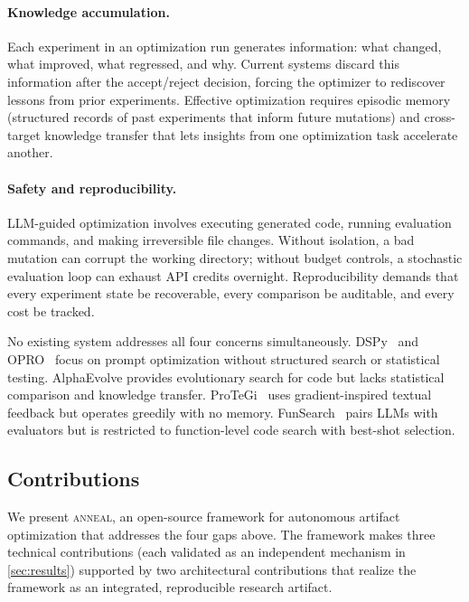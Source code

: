 \paragraph{Knowledge accumulation.}
Each experiment in an optimization run generates information: what changed, what improved, what regressed, and why.
Current systems discard this information after the accept/reject decision, forcing the optimizer to rediscover lessons from prior experiments.
Effective optimization requires episodic memory (structured records of past experiments that inform future mutations) and cross-target knowledge transfer that lets insights from one optimization task accelerate another.

\paragraph{Safety and reproducibility.}
LLM-guided optimization involves executing generated code, running evaluation commands, and making irreversible file changes.
Without isolation, a bad mutation can corrupt the working directory; without budget controls, a stochastic evaluation loop can exhaust API credits overnight.
Reproducibility demands that every experiment state be recoverable, every comparison be auditable, and every cost be tracked.

\medskip

No existing system addresses all four concerns simultaneously.
DSPy~\cite{khattab2024dspy} and OPRO~\cite{yang2024opro} focus on prompt optimization without structured search or statistical testing.
AlphaEvolve provides evolutionary search for code but lacks statistical comparison and knowledge transfer.
ProTeGi~\cite{pryzant2023protegi} uses gradient-inspired textual feedback but operates greedily with no memory.
FunSearch~\cite{romera2024funsearch} pairs LLMs with evaluators but is restricted to function-level code search with best-shot selection.

\subsection{Contributions}

We present \textsc{anneal}, an open-source framework for autonomous artifact optimization that addresses the four gaps above.
The framework makes three technical contributions (each validated as an independent mechanism in \cref{sec:results}) supported by two architectural contributions that realize the framework as an integrated, reproducible research artifact.


